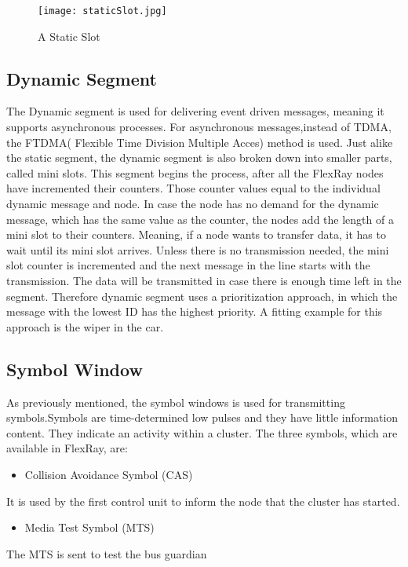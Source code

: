 \documentclass[conference]{IEEEtran}
\begin{document}
\begin{figure}[htbp]
 \centerline{ \texttt{[image: staticSlot.jpg]}}
  \caption{A Static Slot}
  \label{fig:slot}
\end{figure}

\subsection{Dynamic Segment}
The Dynamic segment is used for delivering event driven messages, meaning it supports asynchronous processes. For asynchronous messages,instead of TDMA, the FTDMA( Flexible Time Division Multiple Acces) method is used. Just alike the static segment, the dynamic segment is also broken down into smaller parts, called mini slots. This segment begins the process, after all the FlexRay nodes have incremented their counters. Those counter values equal to the individual dynamic message and node. In case the node has no demand for the dynamic message, which has the same value as the counter, the nodes add the length of a mini slot to their counters. Meaning, if a node wants to transfer data, it has to wait until its mini slot arrives. Unless there is no transmission needed, the mini slot counter is incremented and the next message in the line starts with the transmission. The data will be transmitted in case there is enough time left in the segment. Therefore dynamic segment uses a prioritization approach, in which the message with the lowest ID has the highest priority. A fitting example for this approach is the wiper in the car.

\subsection{Symbol Window}
As previously mentioned, the symbol windows is used for transmitting symbols.Symbols are time-determined low pulses and they have little information content. They indicate an activity within a cluster. The three symbols, which are available in FlexRay, are:

\begin{itemize}
  \item Collision Avoidance Symbol (CAS)
\end{itemize}
It is used by the first control unit to inform the node that the cluster has started.

\begin{itemize}
  \item Media Test Symbol (MTS)
\end{itemize}
The MTS is sent to test the bus guardian
\end{document}
